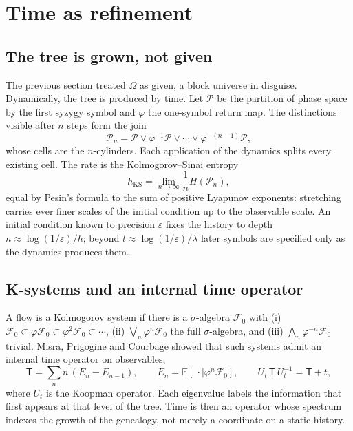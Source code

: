 \documentclass[11pt]{article}
\theoremstyle{remark}
\newcommand{\F}{\mathcal{F}}
\newcommand{\E}{\mathbb{E}}
\begin{document}
\section{Time as refinement}
\label{sec:time}

\subsection{The tree is grown, not given}

The previous section treated $\Omega$ as given, a block universe in disguise. Dynamically, the tree is produced
by time. Let $\mathcal P$ be the partition of phase space by the first syzygy symbol and $\varphi$ the
one-symbol return map. The distinctions visible after $n$ steps form the join
\begin{equation}
  \mathcal P_n=\mathcal P\vee\varphi^{-1}\mathcal P\vee\cdots\vee\varphi^{-(n-1)}\mathcal P,
\end{equation}
whose cells are the $n$-cylinders. Each application of the dynamics splits every existing cell. The rate is
the Kolmogorov--Sinai entropy
\begin{equation}
  h_{\mathrm{KS}}=\lim_{n\to\infty}\frac1n H(\mathcal P_n),
\end{equation}
equal by Pesin's formula \cite{Pesin1977} to the sum of positive Lyapunov exponents: stretching carries ever
finer scales of the initial condition up to the observable scale. An initial condition known to precision
$\varepsilon$ fixes the history to depth $n\approx\log(1/\varepsilon)/h$; beyond $t\approx\log(1/\varepsilon)/\lambda$
later symbols are specified only as the dynamics produces them.

\subsection{K-systems and an internal time operator}

A flow is a Kolmogorov system if there is a $\sigma$-algebra $\F_0$ with
(i) $\F_0\subset\varphi\F_0\subset\varphi^2\F_0\subset\cdots$,
(ii) $\bigvee_n\varphi^n\F_0$ the full $\sigma$-algebra, and
(iii) $\bigwedge_n\varphi^{-n}\F_0$ trivial.
Misra, Prigogine and Courbage \cite{MisraPrigogineCourbage1979} showed that such systems admit an internal
time operator on observables,
\begin{equation}
  \mathsf T=\sum_n n\,(E_n-E_{n-1}),\qquad E_n=\E[\,\cdot\mid\varphi^n\F_0],\qquad
  U_t\,\mathsf T\,U_t^{-1}=\mathsf T+t ,
\end{equation}
where $U_t$ is the Koopman operator. Each eigenvalue labels the information that first appears at that level
of the tree. Time is then an operator whose spectrum indexes the growth of the genealogy, not merely a
coordinate on a static history.
\end{document}
